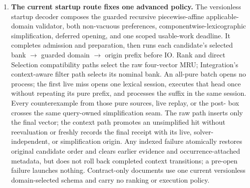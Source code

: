 \documentclass[10pt,letterpaper,oneside]{report}
\newcommand{\code}[1]{\texttt{\detokenize{#1}}}
\begin{document}
\begin{enumerate}
  \item \textbf{The current startup route fixes one advanced policy.} The versionless startup decoder composes the guarded recursive piecewise-affine applicable-domain validator, both non-vacuous preferences, componentwise-lexicographic simplification, deferred opening, and one scoped usable-work deadline. It completes admission and preparation, then runs each candidate's selected bank $\rightarrow$ guarded domain $\rightarrow$ origin prefix before IO. Rank and direct Selection compatibility paths select the raw four-vector MRU; Integration's context-aware filter path selects its nominal bank. An all-pure batch opens no process; the first live miss opens one lexical session, executes that head once without repeating its pure prefix, and processes the suffix in the same session. Every counterexample from those pure sources, live replay, or the post-\code{unsat} box crosses the same query-owned simplification seam. The raw path inserts only the final vector; the context path promotes an unsimplified hit without reevaluation or freshly records the final receipt with its live, solver-independent, or simplification origin. Any indexed failure atomically restores original candidate order and clears earlier evidence and occurrence-attached metadata, but does not roll back completed context transitions; a pre-open failure launches nothing. Contract-only documents use one current versionless domain-selected schema and carry no ranking or execution policy.
\end{enumerate}
\end{document}
